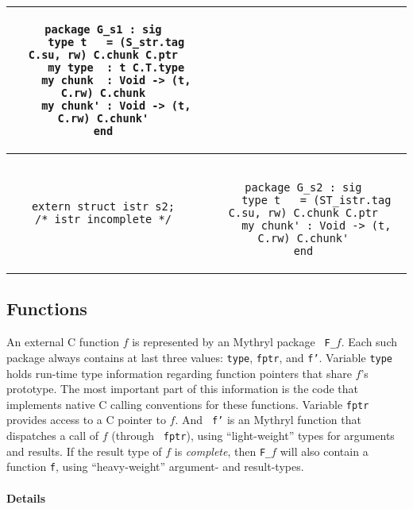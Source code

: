 \begin{small}
\begin{center}
\begin{tabular}{c|c}
\begin{minipage}{4in}
\begin{verbatim}
package G_s1 : sig
    type t   = (S_str.tag C.su, rw) C.chunk C.ptr
    my type  : t C.T.type
    my chunk  : Void -> (t, C.rw) C.chunk
    my chunk' : Void -> (t, C.rw) C.chunk'
end

\end{verbatim}
\end{minipage}
\\ \hline
\begin{minipage}{2in}
\begin{verbatim}
extern struct istr s2;
/* istr incomplete */
\end{verbatim}
\end{minipage}
&
\begin{minipage}{4in}
\begin{verbatim}

package G_s2 : sig
    type t   = (ST_istr.tag C.su, rw) C.chunk C.ptr
    my chunk' : Void -> (t, C.rw) C.chunk'
end

\end{verbatim}
\end{minipage}
\end{tabular}
\end{center}
\end{small}

\subsection{Functions}

An external C function $f$ is represented by an Mythryl package {\tt
  F\_}$f$.  Each such package always contains at last three values:
{\tt type}, {\tt fptr}, and {\tt f'}.  Variable {\tt type} holds
run-time type information regarding function pointers that share $f$'s
prototype.  The most important part of this information is the code
that implements native C calling conventions for these functions.
Variable {\tt fptr} provides access to a C pointer to $f$.  And {\tt
  f'} is an Mythryl function that dispatches a call of $f$ (through {\tt
  fptr}), using ``light-weight'' types for arguments and results.  If
the result type of $f$ is {\em complete}, then {\tt F\_}$f$ will also
contain a function {\tt f}, using ``heavy-weight'' argument- and
result-types.

\paragraph*{Details}

